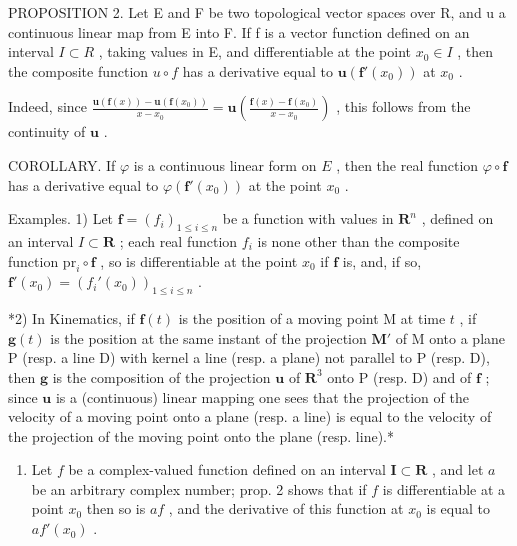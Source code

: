 PROPOSITION 2. Let E and F be two topological vector spaces over R, and u a continuous linear map from E into F. If f is a vector function defined on an interval \(I \subset R\) , taking values in E, and differentiable at the point \(x_{0} \in I\) , then the composite function \(u \circ f\) has a derivative equal to \(\mathbf{u}(\mathbf{f}'(x_{0}))\) at \(x_{0}\) .

Indeed, since \(\frac{\mathbf{u}(\mathbf{f}(x)) - \mathbf{u}(\mathbf{f}(x_0))}{x - x_0} = \mathbf{u}\left(\frac{\mathbf{f}(x) - \mathbf{f}(x_0)}{x - x_0}\right)\) , this follows from the continuity of \(\mathbf{u}\) .

COROLLARY. If \(\varphi\) is a continuous linear form on \(E\) , then the real function \(\varphi \circ \mathbf{f}\) has a derivative equal to \(\varphi(\mathbf{f}'(x_0))\) at the point \(x_0\) .

Examples. 1) Let \(\mathbf{f} = (f_i)_{1\leqslant i\leqslant n}\) be a function with values in \(\mathbf{R}^n\) , defined on an interval \(I\subset \mathbf{R}\) ; each real function \(f_{i}\) is none other than the composite function \(\mathrm{pr}_i\circ \mathbf{f}\) , so is differentiable at the point \(x_0\) if \(\mathbf{f}\) is, and, if so, \(\mathbf{f}'(x_0) = (f_i'(x_0))_{1\leqslant i\leqslant n}\) .

*2) In Kinematics, if \(\mathbf{f}(t)\) is the position of a moving point M at time \(t\) , if \(\mathbf{g}(t)\) is the position at the same instant of the projection \(\mathbf{M}'\) of M onto a plane P (resp. a line D) with kernel a line (resp. a plane) not parallel to P (resp. D), then \(\mathbf{g}\) is the composition of the projection \(\mathbf{u}\) of \(\mathbf{R}^3\) onto P (resp. D) and of \(\mathbf{f}\) ; since \(\mathbf{u}\) is a (continuous) linear mapping one sees that the projection of the velocity of a moving point onto a plane (resp. a line) is equal to the velocity of the projection of the moving point onto the plane (resp. line).*

\begin{enumerate}
\def\labelenumi{\arabic{enumi})}
\setcounter{enumi}{2}
\tightlist
\item
  Let \(f\) be a complex-valued function defined on an interval \(\mathbf{I} \subset \mathbf{R}\) , and let \(a\) be an arbitrary complex number; prop. 2 shows that if \(f\) is differentiable at a point \(x_0\) then so is \(af\) , and the derivative of this function at \(x_0\) is equal to \(af'(x_0)\) .
\end{enumerate}

